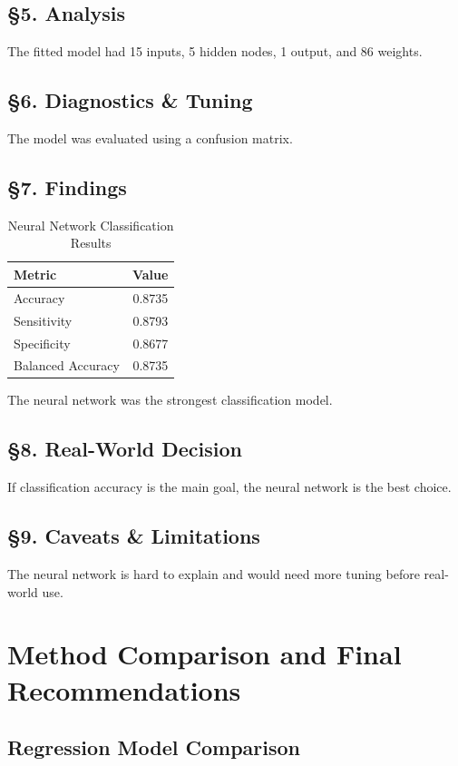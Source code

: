 \documentclass[12pt]{report}
\begin{document}
\section*{\S5. Analysis}
The fitted model had 15 inputs, 5 hidden nodes, 1 output, and 86 weights.

\section*{\S6. Diagnostics \& Tuning}
The model was evaluated using a confusion matrix.

\section*{\S7. Findings}

\begin{table}[H]
\centering
\caption{Neural Network Classification Results}
\begin{tabular}{lr}
\toprule
Metric & Value \\
\midrule
Accuracy & 0.8735 \\
Sensitivity & 0.8793 \\
Specificity & 0.8677 \\
Balanced Accuracy & 0.8735 \\
\bottomrule
\end{tabular}
\end{table}

The neural network was the strongest classification model.

\section*{\S8. Real-World Decision}
If classification accuracy is the main goal, the neural network is the best choice.

\section*{\S9. Caveats \& Limitations}
The neural network is hard to explain and would need more tuning before real-world use.

\newpage

\chapter{Method Comparison and Final Recommendations}

\section{Regression Model Comparison}
\end{document}
